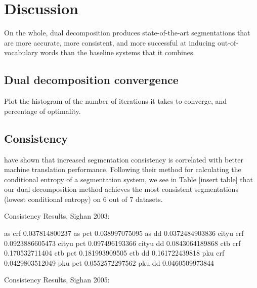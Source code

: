 \section{Discussion}


On the whole, dual decomposition produces state-of-the-art segmentations that are more accurate, more consistent, and more successful at inducing out-of-vocabulary words than the baseline systems that it combines.

\subsection{Dual decomposition convergence}
Plot the histogram of the number of iterations it takes to converge, and percentage of optimality. 

\subsection{Consistency}

\cite{Chang:2008:ACL} have shown that increased segmentation consistency is correlated with better machine translation performance. Following their method for calculating the conditional entropy of a segmentation system, we see in Table [insert table] that our dual decomposition method achieves the most consistent segmentations (lowest conditional entropy) on 6 out of 7 datasets.


Consistency Results, Sighan 2003:

as crf
0.037814800237
as pct
0.038997075095
as dd
0.0372484903836
cityu crf
0.0923886605473
cityu pct
0.097496193366
cityu dd
0.0843064189868
ctb crf
0.170532711404
ctb pct
0.181993909505
ctb dd
0.161722439818
pku crf
0.0429803512049
pku pct
0.0552572297562
pku dd
0.0460509973844


Consistency Results, Sighan 2005:

